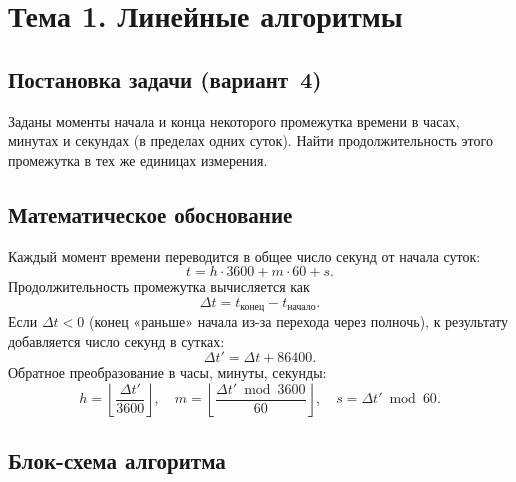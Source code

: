 \section{Тема 1. Линейные алгоритмы}

\subsection{Постановка задачи (вариант~4)}

Заданы моменты начала и конца некоторого промежутка времени
в часах, минутах и секундах (в пределах одних суток).
Найти продолжительность этого промежутка в тех же единицах
измерения.

\subsection{Математическое обоснование}

Каждый момент времени переводится в общее число секунд от начала
суток:
\[
  t = h \cdot 3600 + m \cdot 60 + s.
\]
Продолжительность промежутка вычисляется как
\[
  \Delta t = t_{\text{конец}} - t_{\text{начало}}.
\]
Если $\Delta t < 0$ (конец «раньше» начала из-за перехода через
полночь), к результату добавляется число секунд в сутках:
\[
  \Delta t' = \Delta t + 86400.
\]
Обратное преобразование в часы, минуты, секунды:
\[
  h = \left\lfloor \frac{\Delta t'}{3600} \right\rfloor,\quad
  m = \left\lfloor \frac{\Delta t' \bmod 3600}{60} \right\rfloor,\quad
  s = \Delta t' \bmod 60.
\]

\subsection{Блок-схема алгоритма}

